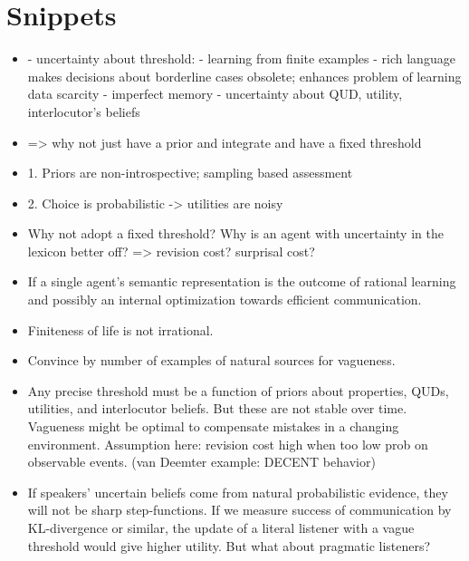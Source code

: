 \documentclass[fleqn,reqno,10pt]{article}
\begin{document}
\printbibliography[heading=bibintoc]

\newpage

\section*{Snippets}

\begin{itemize}
\item - uncertainty about threshold: - learning from finite examples - rich language makes
  decisions about borderline cases obsolete; enhances problem of learning data scarcity -
  imperfect memory - uncertainty about QUD, utility, interlocutor's beliefs

\item   => why not just have a prior and integrate and have a fixed threshold

\item   1. Priors are non-introspective; sampling based assessment

\item   2. Choice is probabilistic -> utilities are noisy

\item   Why not adopt a fixed threshold? Why is an agent with uncertainty in the lexicon better off?
  => revision cost? surprisal cost?

\item   If a single agent's semantic representation is the outcome of rational learning and possibly
  an internal optimization towards efficient communication.

\item   Finiteness of life is not irrational.

\item   Convince by number of examples of natural sources for vagueness.

\item   Any precise threshold must be a function of priors about properties, QUDs, utilities, and
  interlocutor beliefs. But these are not stable over time. Vagueness might be optimal to
  compensate mistakes in a changing environment. Assumption here: revision cost high when too
  low prob on observable events. (van Deemter example: DECENT behavior)

\item   If speakers' uncertain beliefs come from natural probabilistic evidence, they will not be
  sharp step-functions. If we measure success of communication by KL-divergence or similar, the
  update of a literal listener with a vague threshold would give higher utility. But what about
  pragmatic listeners?


\end{itemize}
\end{document}
